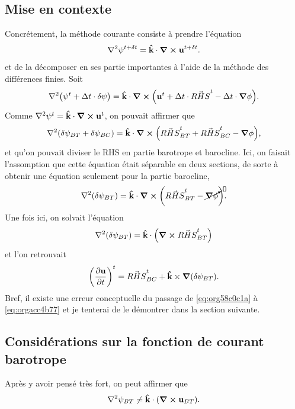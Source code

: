 \documentclass[10pt]{article}
\numberwithin{equation}{section}
\newcommand{\kvf}{\vb{\hat{k}}}
\newcommand{\uu}{\vb{u}}
\begin{document}
\subsection{Mise en contexte}
\label{sec:org61db500}
Concrétement, la méthode courante consiste à prendre l'équation
\begin{equation}
   \laplacian{\psi^{t+\delta t}} = \kvf\cdot\curl{\uu^{t+\delta t}}.
\end{equation}
et de la décomposer en ses partie importantes à l'aide de la méthode des différences finies.
Soit
\begin{equation}
   \laplacian(\psi^t + \Delta t\cdot\delta \psi) = \kvf\cdot\curl(\uu^t + \Delta t\cdot\vec{RHS}^t - \Delta t\cdot\gradient{\phi}).
\end{equation}
Comme \(\laplacian{\psi^t} = \kvf\cdot\curl{\uu^t}\), on pouvait affirmer que
\begin{equation}
\label{eq:org58c0c1a}
   \laplacian(\delta \psi_{BT} + \delta \psi_{BC}) = \kvf\cdot\curl(\vec{RHS}^t_{BT} + \vec{RHS}^t_{BC} - \gradient{\phi}),
\end{equation}
et qu'on pouvait diviser le RHS en partie barotrope et barocline.
Ici, on faisait l'assomption que cette équation était séparable en deux sections, de sorte à obtenir une équation seulement pour la partie barocline,
\begin{equation}
\label{eq:orgacc4b77}
   \laplacian(\delta \psi_{BT}) = \kvf\cdot\curl(\vec{RHS}^t_{BT} - \cancelto{0}{\gradient{\phi}}).
\end{equation}
Une fois ici, on solvait l'équation
\begin{equation}
   \laplacian(\delta \psi_{BT}) = \kvf\cdot\qty(\curl{\vec{RHS}^t_{BT}})
\end{equation}
et l'on retrouvait
\begin{equation}
   \qty(\pdv{\uu}{t})^t = \vec{RHS}^t_{BC} + \kvf\times\gradient(\delta\psi_{BT}).
\end{equation}
Bref, il existe une erreur conceptuelle du passage de \ref{eq:org58c0c1a} à \ref{eq:orgacc4b77} et je tenterai de le démontrer dans la section suivante.


\subsection{Considérations sur la fonction de courant barotrope}
\label{sec:orgeefd6df}
Après y avoir pensé très fort, on peut affirmer que
\begin{equation}
   \laplacian{\psi_{BT}} \not= \kvf\cdot\qty(\curl{\uu_{BT}}).
\end{equation}
\end{document}
